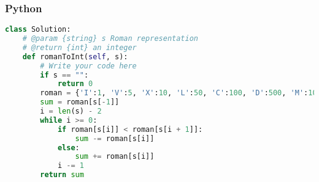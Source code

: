 \subsubsection{Python}
\begin{lstlisting}[language=Python]
class Solution:
    # @param {string} s Roman representation
    # @return {int} an integer
    def romanToInt(self, s):
        # Write your code here
        if s == "":
            return 0
        roman = {'I':1, 'V':5, 'X':10, 'L':50, 'C':100, 'D':500, 'M':1000}
        sum = roman[s[-1]]
        i = len(s) - 2
        while i >= 0:
            if roman[s[i]] < roman[s[i + 1]]:
                sum -= roman[s[i]]
            else:
                sum += roman[s[i]]
            i -= 1
        return sum
\end{lstlisting}
\normalsize 